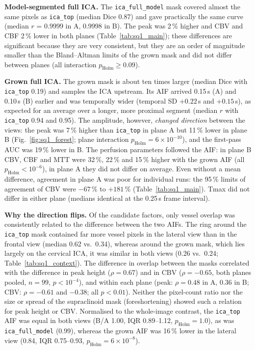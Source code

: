 \textbf{Model-segmented full ICA.} The \texttt{ica\_full\_model} mask covered almost the same pixels as
\texttt{ica\_top} (median Dice 0.87) and gave practically the same curve (median $r$ = 0.9999 in A, 0.9998 in B).
The peak was 2\,\% higher and CBV and CBF 2\,\% lower in both planes (Table~\ref{tab:sq1_main}); these
differences are significant because they are very consistent, but they are an order of magnitude smaller than
the Bland--Altman limits of the grown mask and did not differ between planes (all interaction $p_\mathrm{Holm}
\geq 0.09$).

\textbf{Grown full ICA.} The grown mask is about ten times larger (median Dice with \texttt{ica\_top} 0.19)
and samples the ICA upstream. Its AIF arrived 0.15\,s (A) and 0.10\,s (B) earlier and was temporally wider
(temporal SD $+0.22$\,s and $+0.15$\,s), as expected for an average over a longer, more proximal segment
(median $r$ with \texttt{ica\_top} 0.94 and 0.95). The amplitude, however, \emph{changed direction} between
the views: the peak was 7\,\% higher than \texttt{ica\_top} in plane A but 11\,\% lower in plane B
(Fig.~\ref{fig:sq1_forest}; plane interaction $p_\mathrm{Holm} = 6\times10^{-10}$), and the first-pass AUC
was 19\,\% lower in B. The perfusion parameters followed the AIF: in plane B CBV, CBF and MTT were 32\,\%,
22\,\% and 15\,\% higher with the grown AIF (all $p_\mathrm{Holm} < 10^{-6}$), in plane A they did not differ on
average. Even without a mean difference, agreement in plane A was poor for individual runs: the 95\,\% limits of
agreement of CBV were $-67$\,\% to $+181$\,\% (Table~\ref{tab:sq1_main}). Tmax did not differ in either plane
(medians identical at the 0.25\,s frame interval).

\textbf{Why the direction flips.} Of the candidate factors, only vessel overlap was consistently related to the
difference between the two AIFs. The ring around the \texttt{ica\_top} mask contained far more vessel pixels in
the lateral view than in the frontal view (median 0.62 vs.\ 0.34), whereas around the grown mask, which lies
largely on the cervical ICA, it was similar in both views (0.26 vs.\ 0.24; Table~\ref{tab:sq1_context}). The
difference in overlap between the masks correlated with the difference in peak height ($\rho = 0.67$) and in CBV
($\rho = -0.65$, both planes pooled, $n = 99$, $p < 10^{-4}$), and within each plane (peak: $\rho = 0.48$ in A,
$0.36$ in B; CBV: $\rho = -0.61$ and $-0.38$; all $p < 0.01$). Neither the pixel-count ratio nor the size or
spread of the supraclinoid mask (foreshortening) showed such a relation for peak height or CBV. Normalised to
the whole-image contrast, the \texttt{ica\_top} AIF was equal in both views (B/A 1.00, IQR 0.89--1.12,
$p_\mathrm{Holm} = 1.0$), as was \texttt{ica\_full\_model} (0.99), whereas the grown AIF was 16\,\% lower in the
lateral view (0.84, IQR 0.75--0.93, $p_\mathrm{Holm} = 6\times10^{-8}$).

